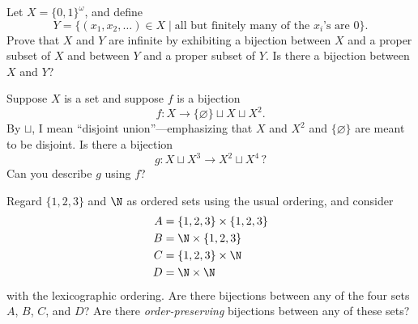 \documentclass[12pt]{pset}
\begin{document}
\begin{problem}[Countability]

  Let $X = \{0,1\}^{\omega}$, and define
  \[
  Y = \{ (x_1,x_2,\ldots) \in X \mid \mbox{all but finitely many of the $x_i$'s are 0} \}.
  \]
  Prove that $X$ and $Y$ are infinite by exhibiting a bijection
  between $X$ and a proper subset of $X$ and between $Y$ and a proper
  subset of $Y$.  Is there a bijection between $X$ and $Y$?

\end{problem}

\begin{problem}

  Suppose $X$ is a set and suppose $f$ is a bijection
  \[
  f : X \to \{ \varnothing \} \sqcup X \sqcup X^2.
  \]
  By $\sqcup$, I mean ``disjoint union''---emphasizing that $X$
  and $X^2$ and $\{ \varnothing \}$ are meant to be disjoint.  Is there a bijection
  \[
  g : X \sqcup X^3 \to X^2 \sqcup X^4 \,?
  \]
  Can you describe $g$ using $f$?

\end{problem}

\begin{problem}[Order]

  Regard $\{1,2,3\}$ and $\N$ as ordered sets using the usual
  ordering, and consider
  \begin{align*}
    A &= \{1,2,3\} \times \{1,2,3\} \\
    B &= \N \times \{1,2,3\} \\
    C &= \{1,2,3\} \times \N \\
    D &= \N \times \N
  \end{align*}
  with the lexicographic ordering.  Are there bijections between any
  of the four sets $A$, $B$, $C$, and $D$?  Are there
  \textit{order-preserving} bijections between any of these sets?

\end{problem}
\end{document}

